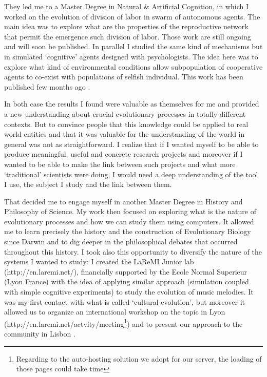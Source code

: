 \documentclass[10pt]{article}
\begin{document}
They led me to a Master Degree in Natural \& Artificial Cognition, in which I worked on the evolution of division of labor in swarm of autonomous agents. The main idea was to explore what are the properties of the reproductive network that permit the emergence such division of labor. Those work are still ongoing and will soon be published. In parallel I studied the same kind of mechanisms but in simulated ‘cognitive’ agents designed with psychologists. The idea here was to explore  what kind of environmental conditions allow subpopulation of cooperative agents to co-exist with populations of selfish individual. This work has been published few months ago \cite{zibetti2015acaciaesanagentbasedmodelingandsimulationtoolforinvestigatingsocialbehaviorsinresourcelimitedtwodimensionalenvironments}.


In both case the results I found were valuable as themselves for me and provided a new understanding about crucial evolutionary processes in totally different contexts. But to convince people that this knowledge could be applied to real world entities and that it was valuable for the understanding of the world in general was not as straightforward. I realize that if I wanted myself to be able to produce meaningful, useful and concrete research projects and moreover if I wanted to be able to make the link between such projects and what more ‘traditional’ scientists were doing, I would need a deep understanding of the tool I use, the subject I study and the link between them. 

That decided me to engage myself in another Master Degree in History and Philosophy of Science. My work then focused on exploring what is the nature of evolutionary processes and how we can study them using computers. It allowed me to learn precisely the history and the construction of Evolutionary Biology since Darwin and to dig deeper in the philosophical debates that occurred throughout this history. I took also this opportunity to diversify the nature of the systems I wanted to study: I created the LaReMI Junior lab (http://en.laremi.net/), financially supported by the Ecole Normal Superieur (Lyon France) with the idea of applying similar approach (simulation coupled with simple cognitive experiments) to study the evolution of music melodies. It was my first contact with what is called ‘cultural evolution’, but moreover it allowed us to organize an international workshop on the topic in Lyon (http://en.laremi.net/actvity/meeting\footnote{Regarding to the auto-hosting solution we adopt for our server, the loading of those pages could take time}) and to present our approach to the community in Lisbon \cite{carrignon2013whyapply}.
\end{document}
